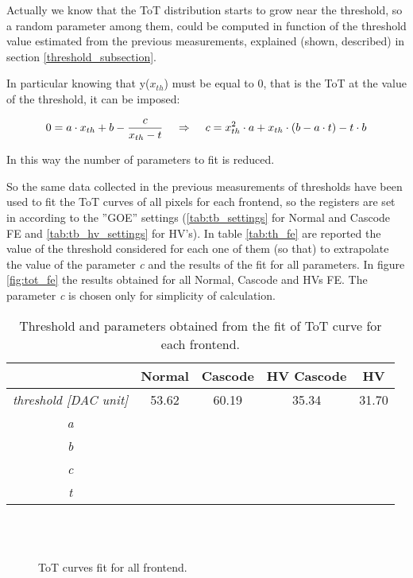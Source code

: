 Actually we know that the ToT distribution starts to grow near the threshold, so a random parameter among them, could be computed in function of the threshold value estimated from the previous measurements, explained (shown, described) in section \ref{threshold_subsection}.

In particular knowing that y($x_{th}$) must be equal to 0, that is the ToT at the value of the threshold, it can be imposed:

\begin{equation}
0 = a\cdot x_{th} + b - \frac{c}{x_{th}-t}  \hspace{.4cm}	\Rightarrow  \hspace{.4cm}	c = x_{th}^{2}\cdot a + x_{th}\cdot (b-a\cdot t) - t\cdot b
\end{equation}

In this way the number of parameters to fit is reduced.

So the same data collected in the previous measurements of thresholds have been used to fit the ToT curves of all pixels for each frontend, so the registers are set in according to the ''GOE'' settings (\vref{tab:tb_settings} for Normal and Cascode FE and \vref{tab:tb_hv_settings} for HV's).
In table \vref{tab:th_fe} are reported the value of the threshold considered for each one of them (so that) to extrapolate the value of the parameter \textit{c} and the results of the fit for all parameters. In figure \vref{fig:tot_fe} the results obtained for all Normal, Cascode and HVs FE. The parameter \textit{c} is chosen only for simplicity of calculation.

\begin{table}[h!]
\centering
\begin{tabular}{c|c|c|c|c}
 & \textbf{Normal} & \textbf{Cascode} & \textbf{HV Cascode} & \textbf{HV} \\
\hline
\textit{threshold [DAC unit]} & 53.62 & 60.19 & 35.34 & 31.70 \\
\textit{a} & & & & \\
\textit{b} & & & & \\
\textit{c} & & & & \\
\textit{t} & & & & \\
\end{tabular}
\caption{Threshold and parameters obtained from the fit of ToT curve for each frontend.}
\label{tab:th_fe}
\end{table}

\begin{figure}[h!]
\centering
{}\quad
{}\\
\quad
{}\\
\caption{ToT curves fit for all frontend.}
\label{fig:tot_fe}
\end{figure}


